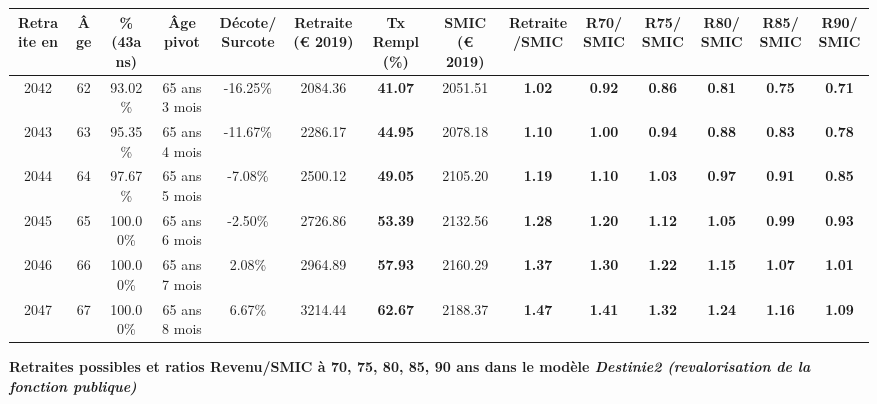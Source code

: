 \begin{adjustbox}{max width=\textwidth} 
\begin{tabular}[htb]{|c|c||c|c|c||c|c||c|c||c|c|c|c|c|} 
\hline 
 Retraite en &  Âge &  \%(43ans) &  Âge pivot &  Décote/Surcote &  Retraite (\euro{} 2019) &  Tx Rempl(\%) &  SMIC (\euro{} 2019) &  Retraite/SMIC &  R70/SMIC &  R75/SMIC &  R80/SMIC &  R85/SMIC &  R90/SMIC \\ 
\hline \hline 
 2042 &  62 &  93.02\% &  65 ans 3 mois &  -16.25\% &  2084.36 &  {\bf 41.07} &  2051.51 &  {\bf 1.02} &  {\bf {\color{red} 0.92}} &  {\bf {\color{red} 0.86}} &  {\bf {\color{red} 0.81}} &  {\bf {\color{red} 0.75}} &  {\bf {\color{red} 0.71}} \\ 
\hline 
 2043 &  63 &  95.35\% &  65 ans 4 mois &  -11.67\% &  2286.17 &  {\bf 44.95} &  2078.18 &  {\bf 1.10} &  {\bf 1.00} &  {\bf {\color{red} 0.94}} &  {\bf {\color{red} 0.88}} &  {\bf {\color{red} 0.83}} &  {\bf {\color{red} 0.78}} \\ 
\hline 
 2044 &  64 &  97.67\% &  65 ans 5 mois &  -7.08\% &  2500.12 &  {\bf 49.05} &  2105.20 &  {\bf 1.19} &  {\bf 1.10} &  {\bf 1.03} &  {\bf {\color{red} 0.97}} &  {\bf {\color{red} 0.91}} &  {\bf {\color{red} 0.85}} \\ 
\hline 
 2045 &  65 &  100.00\% &  65 ans 6 mois &  -2.50\% &  2726.86 &  {\bf 53.39} &  2132.56 &  {\bf 1.28} &  {\bf 1.20} &  {\bf 1.12} &  {\bf 1.05} &  {\bf {\color{red} 0.99}} &  {\bf {\color{red} 0.93}} \\ 
\hline 
 2046 &  66 &  100.00\% &  65 ans 7 mois &  2.08\% &  2964.89 &  {\bf 57.93} &  2160.29 &  {\bf 1.37} &  {\bf 1.30} &  {\bf 1.22} &  {\bf 1.15} &  {\bf 1.07} &  {\bf 1.01} \\ 
\hline 
 2047 &  67 &  100.00\% &  65 ans 8 mois &  6.67\% &  3214.44 &  {\bf 62.67} &  2188.37 &  {\bf 1.47} &  {\bf 1.41} &  {\bf 1.32} &  {\bf 1.24} &  {\bf 1.16} &  {\bf 1.09} \\ 
\hline 
\hline 
\end{tabular} 
\end{adjustbox} 
 
 \vspace{0.1cm} 
{\bf \noindent Retraites possibles et ratios Revenu/SMIC à 70, 75, 80, 85, 90 ans dans le modèle \emph{Destinie2 (revalorisation de la fonction publique)}}  
 
